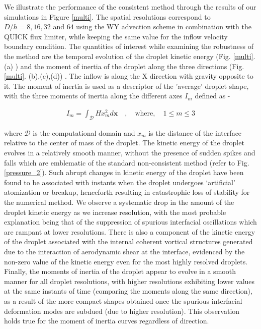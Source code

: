 We illustrate the performance of the consistent method through the 
results of our simulations in Figure \ref{multi}. 
The spatial resolutions correspond to $D/h = 8, 16, 32 $ and $64$ 
using the WY advection scheme in combination with the QUICK flux limiter, 
while keeping the same value for the inflow velocity boundary condition. 
The quantities of interest while examining the robustness of the 
method are the temporal evolution of the droplet kinetic energy 
(Fig. \ref{multi}. (a) ) and the moment of inertia of the droplet 
along the three directions (Fig. \ref{multi}. (b),(c),(d)) . 
The inflow is along the X direction with gravity opposite to it. 
The moment of inertia is used as a descriptor of the 'average' droplet shape, 
with the three moments of inertia along the different axes $I_m$ defined as - 


\begin{align}
	I_m = \int_{\mathcal{D}} H x_m^2 d \boldsymbol{x} \quad , \quad \text{where}, \quad 1 \le m \le 3
\end{align}

where $\mathcal{D}$ is the computational domain and $x_m$ is the 
distance of the interface relative to the center of mass of the droplet.   
The kinetic energy of the droplet evolves in a relatively smooth manner, 
without the presence of sudden spikes and falls which are emblematic of 
the standard non-consistent method (refer to Fig. \ref{pressure_2}). 
Such abrupt changes in kinetic energy of the droplet have been 
found to be associated with instants when the droplet undergoes 
`artificial' atomization or breakup, henceforth resulting in 
catastrophic loss of stability for the numerical method. 
We observe a systematic drop in the amount of the droplet 
kinetic energy as we increase resolution, with the most probable explanation 
being that of the suppression of spurious interfacial 
oscillations which are rampant at lower resolutions. 
There is also a component of the kinetic energy of the droplet 
associated with the internal coherent vortical structures generated due to 
the interaction of aerodynamic shear at the interface, 
evidenced by the non-zero value of the kinetic 
energy even for the most highly resolved droplets. 
Finally, the moments of inertia of the droplet appear to evolve 
in a smooth manner for all droplet resolutions, with higher 
resolutions exhibiting lower values at the same instants of time (comparing the moments along the same direction), 
as a result of the more compact shapes obtained once the 
spurious interfacial deformation modes are subdued (due to higher resolution). 
This observation holds true for the moment of inertia curves regardless of direction.           


